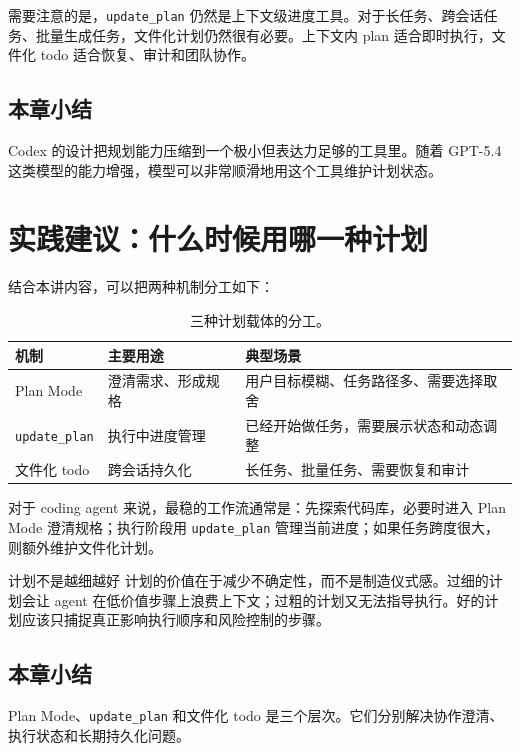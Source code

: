 \documentclass[a4paper]{article}
\begin{document}
需要注意的是，\texttt{update\_plan} 仍然是上下文级进度工具。对于长任务、跨会话任务、批量生成任务，文件化计划仍然很有必要。上下文内 plan 适合即时执行，文件化 todo 适合恢复、审计和团队协作。

\subsection{本章小结}

Codex 的设计把规划能力压缩到一个极小但表达力足够的工具里。随着 GPT-5.4 这类模型的能力增强，模型可以非常顺滑地用这个工具维护计划状态。

\section{实践建议：什么时候用哪一种计划}

结合本讲内容，可以把两种机制分工如下：

\begin{table}[H]
\centering
\begin{tabular}{lll}
\toprule
机制 & 主要用途 & 典型场景 \\
\midrule
Plan Mode & 澄清需求、形成规格 & 用户目标模糊、任务路径多、需要选择取舍 \\
\texttt{update\_plan} & 执行中进度管理 & 已经开始做任务，需要展示状态和动态调整 \\
文件化 todo & 跨会话持久化 & 长任务、批量任务、需要恢复和审计 \\
\bottomrule
\end{tabular}
\caption{三种计划载体的分工。}
\end{table}

对于 coding agent 来说，最稳的工作流通常是：先探索代码库，必要时进入 Plan Mode 澄清规格；执行阶段用 \texttt{update\_plan} 管理当前进度；如果任务跨度很大，则额外维护文件化计划。

\begin{warningbox}{计划不是越细越好}
计划的价值在于减少不确定性，而不是制造仪式感。过细的计划会让 agent 在低价值步骤上浪费上下文；过粗的计划又无法指导执行。好的计划应该只捕捉真正影响执行顺序和风险控制的步骤。
\end{warningbox}

\subsection{本章小结}

Plan Mode、\texttt{update\_plan} 和文件化 todo 是三个层次。它们分别解决协作澄清、执行状态和长期持久化问题。
\end{document}
